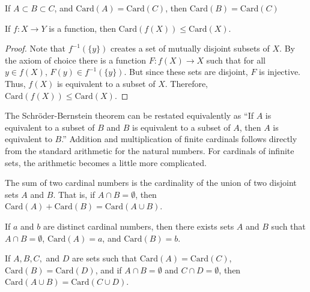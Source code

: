         \begin{theorem}
            If ${A}\subset{B}\subset{C}$, and
            $\mathrm{Card}(A)=\mathrm{Card}(C)$, then $\mathrm{Card}(B)=\mathrm{Card}(C)$
        \end{theorem}
        \begin{theorem}
            If $f:{X}\rightarrow{Y}$ is a function,
            then $\mathrm{Card}(f(X))\leq\mathrm{Card}(X)$.
        \end{theorem}
        \begin{proof}
            Note that $f^{-1}(\{y\})$ creates a set of
            mutually disjoint subsets of $X$. By the
            axiom of choice there is a function
            $F:{f(X)}\rightarrow{X}$
            such that for all ${y}\in{f(X)}$,
            ${F(y)}\in{f^{-1}(\{y\})}$. But since these
            sets are disjoint, $F$ is injective.
            Thus, $f(X)$ is equivalent to a subset of $X$.
            Therefore, $\mathrm{Card}(f(X))\leq\mathrm{Card}(X)$.
        \end{proof}
        The Schr\"{o}der-Bernstein theorem can be restated
        equivalently as ``If $A$ is equivalent to a subset
        of $B$ and $B$ is equivalent to a subset of $A$,
        then $A$ is equivalent to $B$.''
        Addition and multiplication of finite cardinals
        follows directly from the standard arithmetic
        for the natural numbers. For cardinals of infinite
        sets, the arithmetic becomes a little more complicated.
        \begin{definition}
            The sum of two cardinal numbers is the
            cardinality of the union of two disjoint sets $A$
            and $B$. That is, if ${A}\cap{B}=\emptyset$, then
            $\mathrm{Card}(A)+\mathrm{Card}(B)=\mathrm{Card}({A}\cup{B})$.
        \end{definition}
        \begin{theorem}
            If $a$ and $b$ are distinct cardinal numbers,
            then there exists sets $A$ and $B$ such that
            ${A}\cap{B}=\emptyset$, $\mathrm{Card}(A)=a$, and
            $\mathrm{Card}(B)=b$.
        \end{theorem}
        \begin{theorem}
            If $A,B,C,$ and $D$ are sets such that
            $\mathrm{Card}(A)=\mathrm{Card}(C)$, $\mathrm{Card}(B)=\mathrm{Card}(D)$,
            and if ${A}\cap{B}=\emptyset$ and
            ${C}\cap{D}=\emptyset$, then
            $\mathrm{Card}({A}\cup{B})=\mathrm{Card}({C}\cup{D})$.
        \end{theorem}
